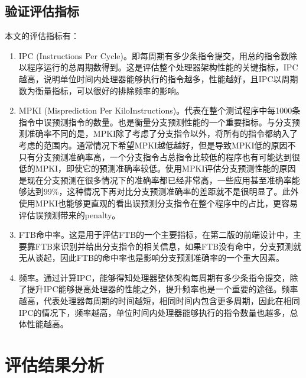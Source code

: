 \subsection{验证评估指标}

本文的评估指标有：

\begin{enumerate}
	\item IPC (Instructions Per Cycle)。即每周期有多少条指令提交，用总的指令数除以程序运行的总周期数得到。这是评估整个处理器架构性能的关键指标，IPC越高，说明单位时间内处理器能够执行的指令越多，性能越好，且IPC以周期数为衡量指标，可以很好的排除频率的影响。
	\item MPKI (Misprediction Per KiloInstructions)。代表在整个测试程序中每1000条指令中误预测指令的数量。也是衡量分支预测性能的一个重要指标。与分支预测准确率不同的是，MPKI除了考虑了分支指令以外，将所有的指令都纳入了考虑的范围内。通常情况下希望MPKI越低越好，但是导致MPKI低的原因不只有分支预测准确率高，一个分支指令占总指令比较低的程序也有可能达到很低的MPKI，即使它的预测准确率较低。使用MPKI评估分支预测性能的原因是现在分支预测在很多情况下的准确率都已经非常高，一些应用甚至准确率能够达到99\%，这种情况下再对比分支预测准确率的差距就不是很明显了。此外使用MPKI也能够更直观的看出误预测分支指令在整个程序中的占比，更容易评估误预测带来的penalty。
	\item FTB命中率。这是用于评估FTB的一个主要指标，在第二版的前端设计中，主要靠FTB来识别并给出分支指令的相关信息，如果FTB没有命中，分支预测就无从谈起，因此FTB的命中率也是影响分支预测准确率的一个重大因素。
	\item 频率。通过计算IPC，能够得知处理器整体架构每周期有多少条指令提交，除了提升IPC能够提高处理器的性能之外，提升频率也是一个重要的途径。频率越高，代表处理器每周期的时间越短，相同时间内包含更多周期，因此在相同IPC的情况下，频率越高，单位时间内处理器能够执行的指令数量也越多，总体性能越高。
\end{enumerate}

\section{评估结果分析}

